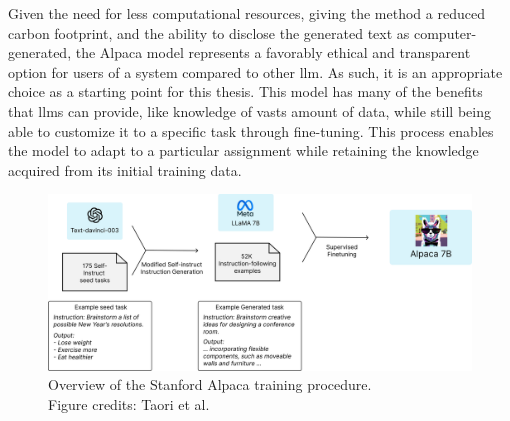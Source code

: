     Given the need for less computational resources, giving the method a reduced carbon footprint, and the ability to disclose the generated text as computer-generated, the Alpaca model represents a favorably ethical and transparent option for users of a system compared to other \gls{llm}. As such, it is an appropriate choice as a starting point for this thesis. This model has many of the benefits that \glspl{llm} can provide, like knowledge of vasts amount of data, while still being able to customize it to a specific task through fine-tuning. This process enables the model to adapt to a particular assignment while retaining the knowledge acquired from its initial training data.

    
    \begin{figure}[htb]
        \centerline{
        \includegraphics[width=17cm]{images/alpaca_framework.jpeg}}
        \caption[Overview of the Stanford Alpaca training procedure.]{Overview of the Stanford Alpaca training procedure.\\Figure credits: Taori et al. \cite{taoriStanfordCRFM}}
        \label{fig:alpaca_training}
    \end{figure}